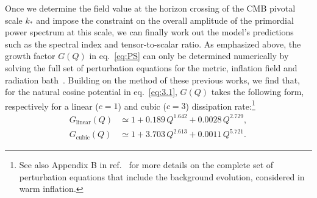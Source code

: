 \documentclass[a4paper,11pt]{article}
\begin{document}
Once we determine the field value at the horizon crossing of the CMB pivotal scale $k_{*}$ and impose the constraint on the overall amplitude of the primordial power spectrum at this scale, we can finally work out the model's predictions such as the spectral index and tensor-to-scalar ratio. As emphasized above, the growth factor $G(Q)$ in eq.~\eqref{eq:PS} can only be determined numerically by solving the full set of perturbation equations for the metric, inflation field and radiation bath~\cite{Graham:2009bf,Bastero-Gil:2011rva,Ramos:2013nsa,Bastero-Gil:2014jsa}. Building on the method of these previous works, we find that, for the natural cosine potential in eq.~\eqref{eq:3.1}, $G(Q)$ takes the following form, respectively for a linear ($c=1$) and cubic ($c=3$) dissipation rate:\footnote{See also Appendix B in ref.~\cite{Das:2020xmh} for more details on the complete set of perturbation equations that include the background evolution, considered in warm inflation.}
\begin{align}
    G_{\mathrm{linear}}\left(Q\right) &\simeq 1+0.189\,Q^{1.642}+0.0028\,Q^{2.729}, \label{eq:G_1}\\
    G_{\mathrm{cubic}}\left(Q\right) &\simeq 1+3.703\,Q^{2.613}+0.0011\,Q^{5.721}. \label{eq:G_3}
\end{align}
\end{document}
